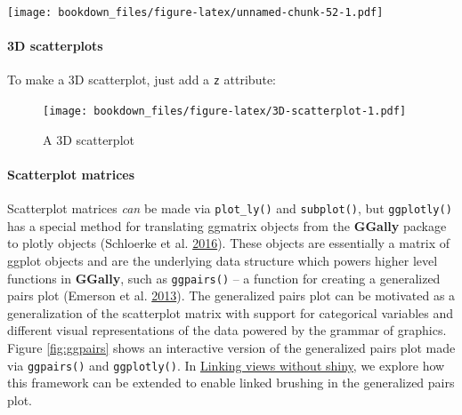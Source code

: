 \documentclass[12pt,]{isuthesis}
\newenvironment{Shaded}{\begin{snugshade}}{\end{snugshade}}
\newcommand{\KeywordTok}[1]{\textcolor[rgb]{0.13,0.29,0.53}{\textbf{{#1}}}}
\newcommand{\DataTypeTok}[1]{\textcolor[rgb]{0.13,0.29,0.53}{{#1}}}
\newcommand{\StringTok}[1]{\textcolor[rgb]{0.31,0.60,0.02}{{#1}}}
\newcommand{\NormalTok}[1]{{#1}}
\let\oldparagraph\paragraph
\renewcommand{\paragraph}[1]{\oldparagraph{#1}\mbox{}}
\begin{document}
\texttt{[image: bookdown\_files/figure-latex/unnamed-chunk-52-1.pdf]}

\paragraph{3D scatterplots}\label{d-scatterplots}

To make a 3D scatterplot, just add a \texttt{z} attribute:

\begin{Shaded}
\end{Shaded}

\begin{figure}[htbp]
\centering
\texttt{[image: bookdown\_files/figure-latex/3D-scatterplot-1.pdf]}
\caption{\label{fig:3D-scatterplot}A 3D scatterplot}
\end{figure}

\hypertarget{scatterplot-matrices}{\paragraph{Scatterplot
matrices}\label{scatterplot-matrices}}

Scatterplot matrices \emph{can} be made via \texttt{plot\_ly()} and
\texttt{subplot()}, but \texttt{ggplotly()} has a special method for
translating ggmatrix objects from the \textbf{GGally} package to plotly
objects (Schloerke et al. \protect\hyperlink{ref-GGally}{2016}). These
objects are essentially a matrix of ggplot objects and are the
underlying data structure which powers higher level functions in
\textbf{GGally}, such as \texttt{ggpairs()} -- a function for creating a
generalized pairs plot (Emerson et al.
\protect\hyperlink{ref-gpp}{2013}). The generalized pairs plot can be
motivated as a generalization of the scatterplot matrix with support for
categorical variables and different visual representations of the data
powered by the grammar of graphics. Figure \ref{fig:ggpairs} shows an
interactive version of the generalized pairs plot made via
\texttt{ggpairs()} and \texttt{ggplotly()}. In
\protect\hyperlink{linking-views-without-shiny}{Linking views without
shiny}, we explore how this framework can be extended to enable linked
brushing in the generalized pairs plot.
\end{document}
